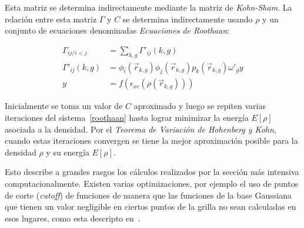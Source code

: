 Esta matriz se determina indirectamente mediante la matriz de \textit{Kohn-Sham}. La
relaci\'on entre esta matriz $\Gamma$ y $C$ se determina indirectamente usando $\rho$
y un conjunto de ecuaciones denominadas \textit{Ecuaciones de Roothaan}:

\begin{align}
    \label{roothaan}
    \Gamma_{ij/ i < j} & = \sum_{k,g} \Gamma'_{ij}(k,g) \\
    \Gamma'_{ij} (k,g) & = \phi_i (\vec{r}_{k,g}) \phi_j (\vec{r}_{k,g}) p_k(\vec{r}_{k,g}) \omega'_g y \\
    y & = f(\epsilon_{xc}(\rho(\vec{r}_{k,g}))) 
\end{align}

Inicialmente se toma un valor de $C$ aproximado y luego se repiten varias iteraciones
del sistema~\ref{roothaan} hasta lograr minimizar la energ\'ia $E[\rho]$ asociada
a la densidad. Por el \textit{Teorema de Variaci\'on de Hohenberg y Kohn}, cuando
estas iteraciones convergen se tiene la mejor aproximaci\'on posible para la
densidad $\rho$ y su energ\'ia $E[\rho]$.

Esto describe a grandes rasgos los c\'alculos realizados por la secci\'on m\'as
intensiva computacionalmente. Existen varias optimizaciones, por ejemplo el uso de
puntos de corte (\textit{cutoff}) de funciones de manera que las funciones de la
base Gaussiana que tienen un valor negligible en ciertos puntos de la grilla no
sean calculadas en esos lugares, como esta descripto en~\cite{PaperNitscheManu}.
